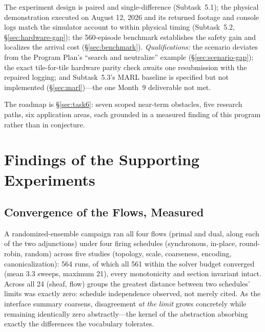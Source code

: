 \documentclass[11pt]{article}
\theoremstyle{definition}
\theoremstyle{remark}
\begin{document}
\begin{description}[leftmargin=1.8em,style=nextline]
\item[Task 5 --- Partial.]
  The experiment design is paired and single-difference (Subtask~5.1); the physical
  demonstration executed on August 12, 2026 and its returned footage and console logs match
  the simulator account to within physical timing (Subtask~5.2,
  \S\ref{sec:hardware-gap}); the 560-episode benchmark establishes the safety gain and
  localizes the arrival cost (\S\ref{sec:benchmark}).
  \emph{Qualifications:} the scenario deviates from the Program Plan's ``search and
  neutralize'' example (\S\ref{sec:scenario-gap}); the exact tile-for-tile hardware parity
  check awaits one resubmission with the repaired logging; and Subtask~5.3's MARL baseline is
  specified but not implemented (\S\ref{sec:marl})---the one Month~9 deliverable not met.

\item[Task 6 --- Complete.]
  The roadmap is \S\ref{sec:task6}: seven scoped near-term obstacles, five research paths, six
  application areas, each grounded in a measured finding of this program rather than in
  conjecture.
\end{description}




\newpage
\appendix
\section{Findings of the Supporting Experiments}
\label{sec:app-findings}

\subsection{Convergence of the Flows, Measured}
\label{sec:app-convergence}

A randomized-ensemble campaign ran all four flows (primal and dual, along each of the two
adjunctions) under four firing schedules (synchronous, in-place, round-robin, random) across
five studies (topology, scale, coarseness, encoding, canonicalization): 564 runs, of which all
561 within the solver budget converged (mean 3.3 sweeps, maximum 21), every monotonicity and
section invariant intact.
Across all 24 (sheaf, flow) groups the greatest distance between two schedules' limits was
exactly zero: schedule independence observed, not merely cited.
As the interface summary coarsens, disagreement \emph{at the limit} grows concretely while
remaining identically zero abstractly---the kernel of the abstraction absorbing exactly the
differences the vocabulary tolerates.
\end{document}
